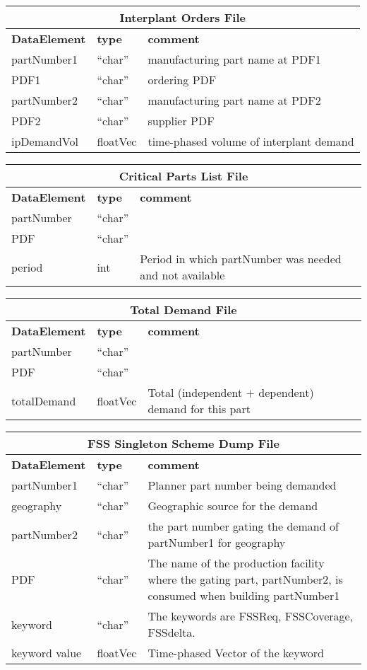 \begin{tabular}{llp{4in}}
\multicolumn{3}{c}{{\bf Interplant Orders File}}\\ \hline\hline
{\bf DataElement} &  {\bf type}  &   {\bf comment} \\ \hline
partNumber1 &  ``char'' &  manufacturing part name at PDF1  \\ 
PDF1   & ``char'' & ordering PDF \\
partNumber2 &  ``char'' & manufacturing part name at PDF2    \\ 
PDF2   & ``char'' & supplier PDF \\
ipDemandVol & floatVec &  time-phased volume of interplant demand \\
\end{tabular}

\vspace{.5in}

\begin{tabular}{llp{4in}}
\multicolumn{3}{c}{{\bf Critical Parts List File}}\\ \hline\hline
{\bf DataElement} &  {\bf type}  &   {\bf comment} \\ \hline
partNumber &  ``char''     \\ 
PDF   & ``char''  \\
period & int & Period in which partNumber was needed and not available
\end{tabular}

\vspace{.5in}

\begin{tabular}{llp{4in}}
\multicolumn{3}{c}{{\bf Total Demand File}}\\ \hline\hline
{\bf DataElement} &  {\bf type}  &   {\bf comment} \\ \hline
partNumber &  ``char''     \\ 
PDF   & ``char''  \\
totalDemand & floatVec & Total (independent $+$ dependent) demand for this part
\end{tabular}

\vspace{.5in}

\begin{tabular}{llp{4in}}
\multicolumn{3}{c}{{\bf FSS Singleton Scheme Dump File}}\\ \hline\hline
{\bf DataElement} &  {\bf type}  &   {\bf comment} \\ \hline
partNumber1 & ``char'' & Planner part number being demanded    \\ 
geography & ``char'' & Geographic source for the demand \\
partNumber2 & ``char'' & the part number gating the demand of partNumber1 for
 geography \\
PDF & ``char'' & The name of the production facility where the gating 
 part, partNumber2, is consumed when building partNumber1 \\
keyword & ``char''  & The keywords are FSSReq, FSSCoverage, FSSdelta. \\
keyword value  & floatVec &  Time-phased Vector of the keyword 
\end{tabular}

